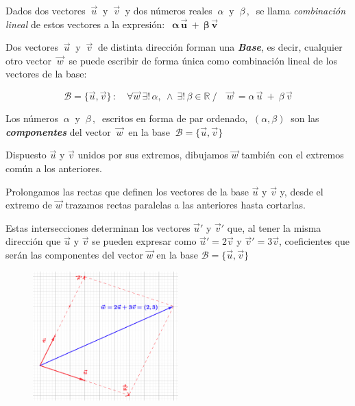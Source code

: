 	
	
\begin{definition}

Dados dos vectores $\ \vec u \ \text{ y } \ \vec v \ $ y dos números reales $\ \alpha \  \text{ y } \ \beta \, , \  $ se llama \emph{combinación lineal} de estos vectores a la expresión: $\ \ \boldsymbol{\alpha \, \vec u \ + \ \beta \, \vec v }$
	
\end{definition}
\vspace{5mm}
\begin{definition}[ Base]

Dos vectores $\ \vec u \ \text{ y } \ \vec v \ $ de distinta dirección forman una \textbf{\emph{Base}}, es decir, cualquier otro vector $\ \vec w \ $ se puede escribir de forma única como combinación lineal de los vectores de la base:

$$\mathcal B=\{\vec u,\vec v\} \, : \quad \forall \vec w \  \exists! \,  \alpha, \ \wedge\  \exists! \,  \beta \in \mathbb R \ / \quad \vec w \ = \alpha \, \vec u \ + \ \beta \, \vec v $$

Los números $\ \alpha \  \text{ y } \ \beta \, , \  $ escritos en forma de par ordenado, $\ (\alpha,\beta)\ $ son las \textbf{\emph{componentes}} del vector $\ \vec w\ $ en la base $\ \mathcal B=\{\vec u,\vec v\}\ $
\end{definition}

\begin{multicols}{2}

Dispuesto $\vec u$ y $\vec v$ unidos por sus extremos, dibujamos $\vec w$ también con el extremos común a los anteriores.

Prolongamos las rectas que definen los vectores de la base $\vec u$ y $\vec v$ y, desde el extremo de $\vec w$ trazamos rectas paralelas a las anteriores hasta cortarlas.

Estas intersecciones determinan los vectores $\vec u'$ y $\vec v'$ que, al tener la misma dirección que $\vec u$ y $\vec v$ se pueden expresar como $\vec u'=2\vec v$ y $\vec v'=3\vec v$, coeficientes que serán las componentes del vector $\vec w$ en la base $\mathcal B=\{\vec u,\vec v\}$

\begin{figure}[H]
	\centering
	\includegraphics[width=0.5\textwidth]{img-vec/vec06.png}	
\end{figure}	
\end{multicols}

